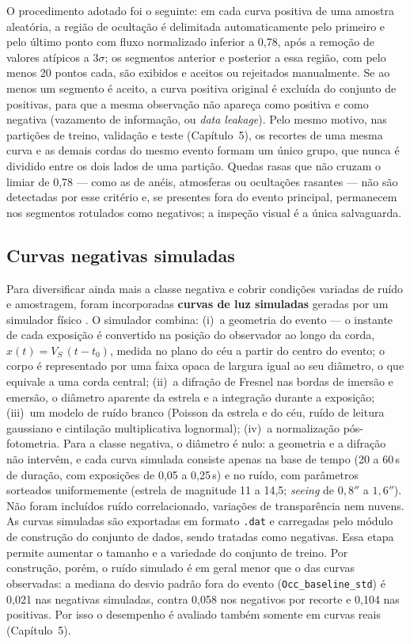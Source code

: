 O procedimento adotado foi o seguinte: em cada curva positiva de uma amostra aleatória, a região de ocultação é delimitada automaticamente pelo primeiro e pelo último ponto com fluxo normalizado inferior a 0,78, após a remoção de valores atípicos a \(3\sigma\); os segmentos anterior e posterior a essa região, com pelo menos 20 pontos cada, são exibidos e aceitos ou rejeitados manualmente. Se ao menos um segmento é aceito, a curva positiva original é excluída do conjunto de positivas, para que a mesma observação não apareça como positiva e como negativa (vazamento de informação, ou \textit{data leakage}). Pelo mesmo motivo, nas partições de treino, validação e teste (Capítulo~5), os recortes de uma mesma curva e as demais cordas do mesmo evento formam um único grupo, que nunca é dividido entre os dois lados de uma partição. Quedas rasas que não cruzam o limiar de 0,78 --- como as de anéis, atmosferas ou ocultações rasantes --- não são detectadas por esse critério e, se presentes fora do evento principal, permanecem nos segmentos rotulados como negativos; a inspeção visual é a única salvaguarda.

\subsection{Curvas negativas simuladas}

Para diversificar ainda mais a classe negativa e cobrir condições variadas de ruído e amostragem, foram incorporadas \textbf{curvas de luz simuladas} geradas por um simulador físico \citep{Simulator}. O simulador combina: (i)~a geometria do evento --- o instante de cada exposição é convertido na posição do observador ao longo da corda, \(x(t) = V_S\,(t-t_0)\), medida no plano do céu a partir do centro do evento; o corpo é representado por uma faixa opaca de largura igual ao seu diâmetro, o que equivale a uma corda central; (ii)~a difração de Fresnel nas bordas de imersão e emersão, o diâmetro aparente da estrela e a integração durante a exposição; (iii)~um modelo de ruído branco (Poisson da estrela e do céu, ruído de leitura gaussiano e cintilação multiplicativa lognormal); (iv)~a normalização pós-fotometria. Para a classe negativa, o diâmetro é nulo: a geometria e a difração não intervêm, e cada curva simulada consiste apenas na base de tempo (20 a 60\,s de duração, com exposições de 0,05 a 0,25\,s) e no ruído, com parâmetros sorteados uniformemente (estrela de magnitude 11 a 14,5; \textit{seeing} de \(0{,}8''\) a \(1{,}6''\)). Não foram incluídos ruído correlacionado, variações de transparência nem nuvens. As curvas simuladas são exportadas em formato \texttt{.dat} e carregadas pelo módulo de construção do conjunto de dados, sendo tratadas como negativas. Essa etapa permite aumentar o tamanho e a variedade do conjunto de treino. Por construção, porém, o ruído simulado é em geral menor que o das curvas observadas: a mediana do desvio padrão fora do evento (\texttt{Occ\_baseline\_std}) é 0,021 nas negativas simuladas, contra 0,058 nos negativos por recorte e 0,104 nas positivas. Por isso o desempenho é avaliado também somente em curvas reais (Capítulo~5).

